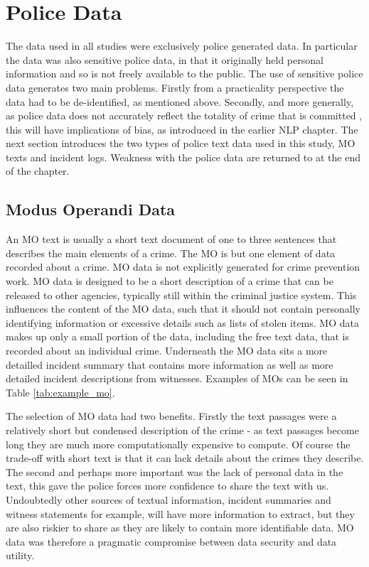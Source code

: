 \section{Police Data} The data used in all studies were exclusively police generated data. In particular the data was also sensitive police data, in that it originally held personal information and so is not freely available to the public. The use of sensitive police data generates two main problems. Firstly from a practicality perspective the data had to be de-identified, as mentioned above. Secondly, and more generally,  as police data does not accurately reflect the totality of crime that is committed \parencite{Tarling}, this will have implications of bias, as introduced in the earlier NLP chapter. The next section introduces the two types of police text data used in this study, MO texts and incident logs. Weakness with the police data are returned to at the end of the chapter.


\subsection{Modus Operandi Data} An MO text is usually a short text document of one to three sentences that describes the main elements of a crime. The MO is but one element of data recorded about a crime. MO data is not explicitly generated for crime prevention work. MO data is designed to be a short description of a crime that can be released to other agencies, typically still within the criminal justice system. This influences the content of the MO data, such that it should not contain personally identifying information or excessive details such as lists of stolen items. MO data makes up only a small portion of the data, including the free text data, that is recorded about an individual crime. Underneath the MO data sits a more detailled incident summary that contains more information as well as more detailed incident descriptions from witnesses.  Examples of MOs can be seen in Table \ref{tab:example_mo}.

The selection of MO data had two benefits. Firstly the text passages were a relatively short but condensed description of the crime - as text passages become long they are much more computationally expensive to compute. Of course the trade-off with short text is that it can lack details about the crimes they describe.  The second and perhaps more important was the lack of personal data in the text, this gave the police forces more confidence to share the text with us. Undoubtedly other sources of textual information, incident summaries and witness statements for example, will have more information to extract, but they are also riskier to share as they are likely to contain more identifiable data. MO data was therefore a pragmatic compromise between data security and data utility.


